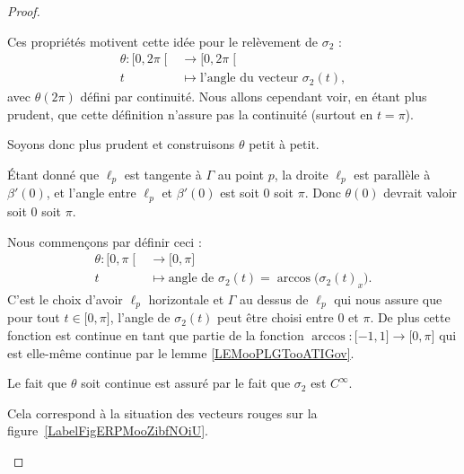 \begin{proof}
\begin{subproof}
		Ces propriétés motivent cette idée pour le relèvement de \( \sigma_2\) :
		\begin{equation}
			\begin{aligned}
				\theta\colon \mathopen[ 0 , 2\pi \mathclose[ & \to\mathopen[ 0 , 2\pi \mathclose[              \\
				t                                            & \mapsto \text{l'angle du vecteur } \sigma_2(t),
			\end{aligned}
		\end{equation}
		avec \( \theta(2\pi)\) défini par continuité. Nous allons cependant voir, en étant plus prudent, que cette définition n'assure pas la continuité (surtout en \( t=\pi\)).

		Soyons donc plus prudent et construisons \( \theta\) petit à petit.

		Étant donné que \( \ell_p\) est tangente à \( \Gamma\) au point \(p \), la droite \( \ell_p\) est parallèle à \( \beta'(0)\), et l'angle entre \( \ell_p\) et \( \beta'(0)\) est soit \( 0\) soit \( \pi\). Donc \( \theta(0)\) devrait valoir soit \(0\) soit \(\pi\).

		Nous commençons par définir ceci :
		\begin{equation}
			\begin{aligned}
				\theta\colon \mathopen[ 0 , \pi \mathclose[ & \to \mathopen[ 0 , \pi \mathclose]                                        \\
				t                                           & \mapsto \text{angle de } \sigma_2(t)=\arccos\big(  \sigma_2(t)_x   \big).
			\end{aligned}
		\end{equation}
		C'est le choix d'avoir \( \ell_p\) horizontale et \( \Gamma\) au dessus de \( \ell_p\) qui nous assure que pour tout \( t\in\mathopen[ 0 , \pi \mathclose]\), l'angle de \( \sigma_2(t)\) peut être choisi entre \( 0\) et \( \pi\). De plus cette fonction est continue en tant que partie de la fonction \( \arccos\colon \mathopen[ -1 , 1 \mathclose]\to \mathopen[ 0 , \pi \mathclose]\) qui est elle-même continue par le lemme \ref{LEMooPLGTooATIGov}.

		Le fait que \( \theta\) soit continue est assuré par le fait que \( \sigma_2\) est \(  C^{\infty}\).

		\begin{subproof}
			\spitem[Si \( \theta(0)=0\)]

			Cela correspond à la situation des vecteurs rouges sur la figure~\ref{LabelFigERPMooZibfNOiU}.


\end{subproof}
\end{subproof}
\end{proof}
